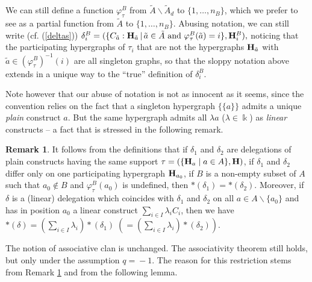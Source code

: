 \documentclass[11pt]{article}
\theoremstyle{definition}
\newtheorem{remark}[theo]{Remark}
\numberwithin{equation}{section}
\numberwithin{equation}{section}
\newcommand{\nin}{\not\in}
\newcommand{\set}[1]{\{#1\}}
\newcommand{\setc}[2]{\set{#1 \mid #2}}
\newcommand{\hyper}[1]{{\bf #1}}
\begin{document}
We can still define a function $\varphi_{\tau}^B$ from $\tilde{A}\backslash\tilde{A}_d$ to $\set{1,\ldots,n_B}$, which we prefer to see as a partial function from $\tilde{A}$ to $\set{1,\ldots,n_B}$. Abusing notation, we can still write (cf. (\ref{deltas}))
$\delta^B_i=(\{C_{\tilde{a}}:{\bf H}_{\tilde{a}}\,|\, \tilde{a}\in \tilde{A} \mbox{ and }\varphi_\tau^B(\tilde{a})=i\},{\bf H}_i^B),$
noticing  that the  participating hypergraphs of  $\tau_i$ that are not the hypergraphs  ${\bf H}_{\tilde{a}}$ with 
$\tilde{a}\in (\varphi_\tau^B)^{-1}(i)$
are all singleton graphs, so that the sloppy notation above extends in a unique way to the ``true'' definition of $\delta^B_i$.

Note however that our abuse of notation is not as innocent as it seems, since the convention relies on the fact that a singleton hypergraph 
$\set{\set{a}}$ admits a unique {\it plain} construct $a$. 
But the same hypergraph admits all $\lambda a$ ($\lambda\in\Bbbk$) as {\it linear} constructs -- a fact that is stressed in the following remark.



\begin{remark} \label{dissolution-irrelevance}
It follows from the definitions that
if $\delta_1$ and $\delta_2$ are delegations of plain constructs having the same support $\tau=(\setc{\hyper{H}_a}{a\in A},\hyper{H})$, if $\delta_1$ and $\delta_2$ differ only on one participating hypergraph $\hyper{H}_{a_0}$,  if $B$ is a non-empty subset of $A$ such that $a_0\nin B$ and $\varphi_\tau^B(a_0)$ is undefined, then $\ast(\delta_1)=\ast(\delta_2)$.  Moreover, if $\delta$ is a (linear) delegation which coincides with $\delta_1$ and $\delta_2$ on all $a\in A\backslash\set{a_0}$ and has in position $a_0$ a linear construct $\sum_{i\in I} \lambda_i C_i$, then we have $\ast(\delta) = (\sum_{i\in I} \lambda_i) \ast\!(\delta_1) \; (= (\sum_{i\in I} \lambda_i) \ast\!(\delta_2))$.
\end{remark}

The notion of associative clan is unchanged.  
The associativity theorem still holds, but only under the assumption $q\!=\!-1$.  The reason for this restriction stems from Remark \ref{dissolution-irrelevance} and from the following lemma.
\end{document}
